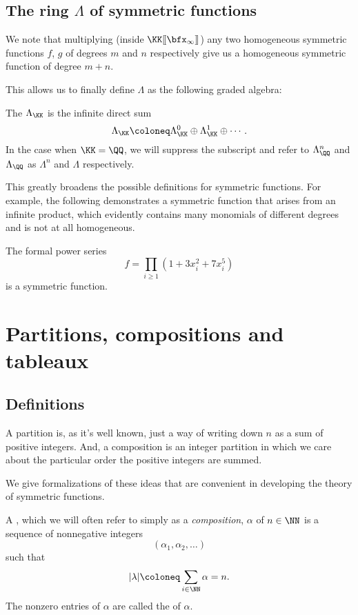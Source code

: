 \documentclass{article}
\newcommand{\fps}[2]{#1 [\kern-1.2pt[ {#2} ]\kern-1.2pt]}
\begin{document}
\subsection{The ring $\Lambda$ of symmetric functions}

We note that multiplying (inside $\fps{\KK}{\bfx_\infty}$) any two homogeneous symmetric functions $f$, $g$ of degrees $m$ and $n$ respectively give us a homogeneous symmetric function of degree $m+n$.

This allows us to finally define $\Lambda$ as the following graded algebra:

\begin{definition}
    The  $\Lambda_\KK$ is the infinite direct sum
    \[
        \Lambda_\KK \coloneq \Lambda_\KK^0 \oplus\Lambda_\KK^1 \oplus \cdots.
    \]
    In the case when $\KK = \QQ$, we will suppress the subscript and refer to $\Lambda_\QQ^n$ and $\Lambda_\QQ$ as $\Lambda^n$ and $\Lambda$ respectively.
\end{definition}

This greatly broadens the possible definitions for symmetric functions. 
For example, the following demonstrates a symmetric function that arises from an infinite product, which evidently contains many monomials of different degrees and is not at all homogeneous.

\begin{example}
    The formal power series 
    \[
        f = \prod_{i\geq1} (1 + 3x_i^2 + 7x_i^5)
    \]
    is a symmetric function.
\end{example}

\section{Partitions, compositions and tableaux}

\subsection{Definitions}

A partition is, as it's well known, just a way of writing down $n$ as a sum of positive integers.
And, a composition is an integer partition in which we care about the particular order the positive integers are summed.

We give formalizations of these ideas that are convenient in developing the theory of symmetric functions.

\begin{definition}
    A , which we will often refer to simply as a \textit{composition}, $\alpha$ of $n \in \NN$ is a sequence of nonnegative integers 
    \[
        (\alpha_1,\alpha_2,\ldots)
    \]
    such that 
    \[
        |\lambda|
        \coloneq
        \sum_{i\in\NN}\alpha
        =
        n.
    \]
    The nonzero entries of $\alpha$ are called the  of $\alpha$.
\end{definition}
\end{document}
